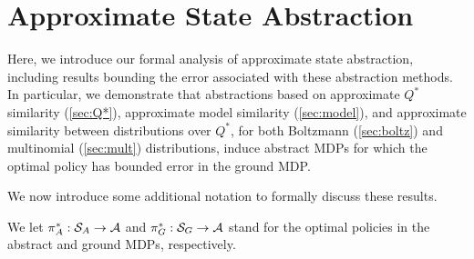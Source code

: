 \section{Approximate State Abstraction}

Here, we introduce our formal analysis of approximate state abstraction, including results bounding the error associated with these abstraction methods. In particular, we demonstrate that abstractions based on approximate $Q^*$ similarity (\ref{sec:Q*}), approximate model similarity (\ref{sec:model}), and approximate similarity between distributions over $Q^*$, for both Boltzmann (\ref{sec:boltz}) and multinomial (\ref{sec:mult}) distributions, induce abstract \acp{MDP} for which the optimal policy has bounded error in the ground MDP.





We now introduce some additional notation to formally discuss these results.

We let $\pi_A^* : \mathcal{S}_A \rightarrow \mathcal{A}$ and $\pi_G^* : \mathcal{S}_G \rightarrow \mathcal{A}$ stand for the optimal policies in the abstract and ground \acp{MDP}, respectively.
\edefn

